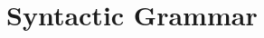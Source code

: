 \makeatletter{}\documentclass[10pt,oneside]{book}
\newcounter{prod}
\newcounter{notemark}
\newcounter{base}
\newcommand{\tag}[1]{${}_{~\!\!\mathtt{#1}}$}
\newcommand{\note}[1]{{\scriptsize #1}}
\newcommand{\grammarprod}{\addtocounter{prod}{1}\\{\tiny
    \arabic{prod}} \>}
\newcommand{\grammarproD}{\addtocounter{prod}{1}{\tiny
    \arabic{prod}} $~~~~$ \=}
\newcommand{\nonterminal}[1]{{\slantsf #1}}
\newcommand{\lexicalnonterminal}[1]{{\sf #1}}
\newcommand{\tagbegin}[1]{\note{$\langle$\underline{#1} }}
\newcommand{\tagend}{\note{$\rangle$}}
\theoremstyle{note}
\newenvironment{notes}
{\footnotesize\color{Red}\underline{\arabic{notemark}}}
{\normalsize\vspace*{5pt}}
\newcommand{\marknote}{\setcounter{base}{\value{prod}}\addtocounter{notemark}{1}$\:{}^{\color{Red}\underline{\arabic{notemark}}}$}
\begin{document}




\section{Syntactic Grammar}\label{sec:syngrammar}


\end{document}

